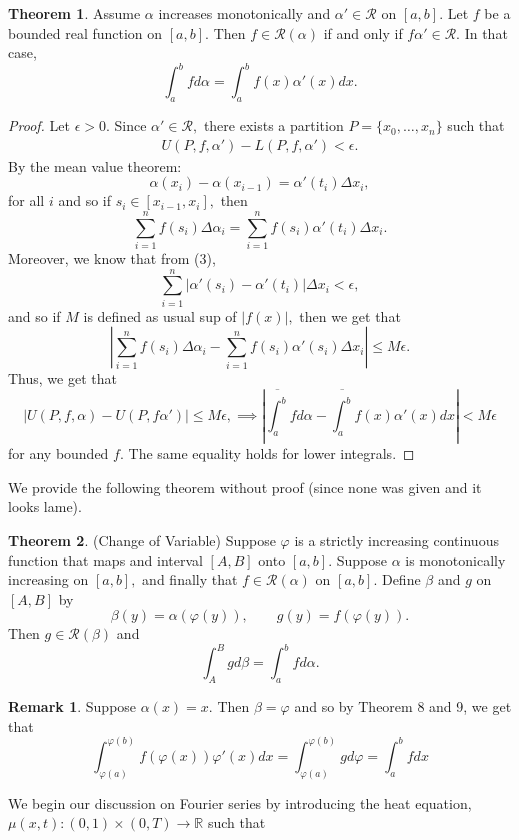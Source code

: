 \documentclass[10pt, oneside]{article}
\newcommand{\bbR}{\mathbb{R}}
\theoremstyle{definition}
\newtheorem{thm}{Theorem}
\newtheorem{rem}{Remark}
\begin{document}
\begin{thm}
    Assume $\alpha$ increases monotonically and $\alpha
' \in \mathcal{R}$ on $[a,b].$ Let $f$ be a bounded real function on $[a,b].$ Then $f\in \mathcal{R}(\alpha)$ if and only if $f\alpha' \in \mathcal{R}.$ In that case,
\[\int_a^b fd\alpha = \int_a^b f(x)\alpha'(x)dx.\]
\end{thm}
\begin{proof}
    Let $\epsilon>0.$ Since $\alpha' \in \mathcal{R},$ there exists a partition $P = \{x_0, \dots, x_n\}$ such that 
    \begin{align}
    U(P,f,\alpha') - L(P,f,\alpha')< \epsilon.    
    \end{align}
     By the mean value theorem:
    \[\alpha(x_i) - \alpha(x_{i-1}) = \alpha'(t_i)\Delta x_i,\] for all $i$ and so if $s_i \in [x_{i-1}, x_i],$ then
    \[\sum_{i=1}^n f(s_i)\Delta\alpha_i = \sum_{i=1}^n f(s_i) \alpha'(t_i)\Delta x_i.\] Moreover, we know that from (3),
    \[\sum_{i=1}^n |\alpha'(s_i) - \alpha'(t_i)| \Delta x_i < \epsilon,\] and so if $M$ is defined as usual sup of $|f(x)|,$ then we get that 
    \[\left|\sum_{i=1}^n f(s_i) \Delta \alpha_i - \sum_{i=1}^n f(s_i)\alpha'(s_i)\Delta x_i\right|\leq M\epsilon.\] Thus, we get that 
    \[|U(P,f,\alpha) - U(P, f\alpha')| \leq M\epsilon, \implies \left|\overline{\int_a^b}fd\alpha - \overline{\int_a^b}f(x)\alpha'(x)dx\right|< M\epsilon\] for any bounded $f.$ The same equality holds for lower integrals.
\end{proof}
We provide the following theorem without proof (since none was given and it looks lame).
\begin{thm}
    (Change of Variable) Suppose $\varphi$ is a strictly increasing continuous function that maps and interval $[A,B]$ onto $[a,b].$ Suppose $\alpha$ is monotonically increasing on $[a,b],$ and finally that $f\in \mathcal{R}(\alpha)$ on $[a,b].$ Define $\beta$ and $g$ on $[A,B]$ by 
    \[\beta(y) = \alpha(\varphi(y)), \qquad g(y) = f(\varphi(y)).\] Then $g\in \mathcal{R}(\beta)$ and 
    \[\int_A^B g d\beta = \int_a^b f d\alpha.\]
\end{thm}
\begin{rem}
    Suppose $\alpha(x) = x.$ Then $\beta = \varphi$ and so by Theorem 8 and 9, we get that
    \[\int_{\varphi(a)}^{\varphi(b)} f(\varphi(x)) \varphi'(x)dx= \int_{\varphi(a)}^{\varphi(b)} g d\varphi = \int_a^b f dx\]
\end{rem}
We begin our discussion on Fourier series by introducing the heat equation, $\mu(x,t): (0,1)\times (0,T) \to \bbR$ such that
\end{document}
